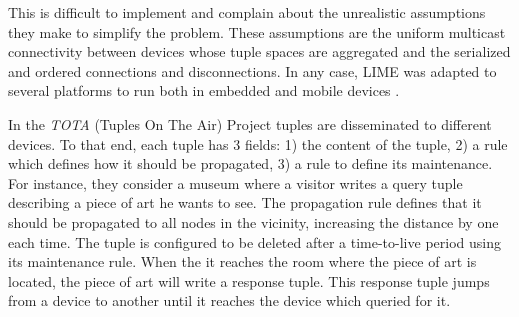 This is difficult to implement and \citet{coulouris_distributed_2012} complain about the unrealistic assumptions they make to simplify the problem. %
These assumptions are the uniform multicast connectivity between devices whose tuple spaces are aggregated and the serialized and ordered connections and disconnections.
In any case, LIME was adapted to several platforms to run both in embedded and mobile devices \citep{murphy_transiently_2006}.


In the \emph{TOTA} (Tuples On The Air) Project \citep{mamei_programming_2009} tuples are disseminated to different devices.
To that end, each tuple has 3 fields:
1) the content of the tuple,
2) a rule which defines how it should be propagated,
3) a rule to define its maintenance.
For instance, they consider a museum where a visitor writes a query tuple describing a piece of art he wants to see.
The propagation rule defines that it should be propagated to all nodes in the vicinity, increasing the distance by one each time.
The tuple is configured to be deleted after a time-to-live period using its maintenance rule.
When the it reaches the room where the piece of art is located, the piece of art will write a response tuple.
This response tuple jumps from a device to another until it reaches the device which queried for it.


